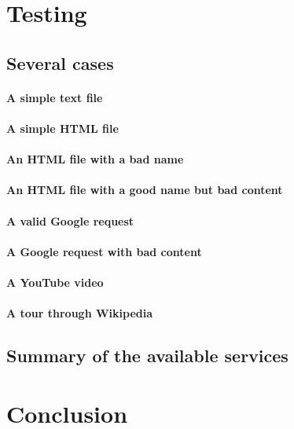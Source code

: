\documentclass[12pt,a4paper]{article}
\begin{document}

\section{Testing}
\subsection{Several cases}
\paragraph{A simple text file}
\paragraph{A simple HTML file}
\paragraph{An HTML file with a bad name}
\paragraph{An HTML file with a good name but bad content}
\paragraph{A valid Google request}
\paragraph{A Google request with bad content}
\paragraph{A YouTube video}
\paragraph{A tour through Wikipedia}
\subsection{Summary of the available services} 

\section{Conclusion}

    
\end{document}
